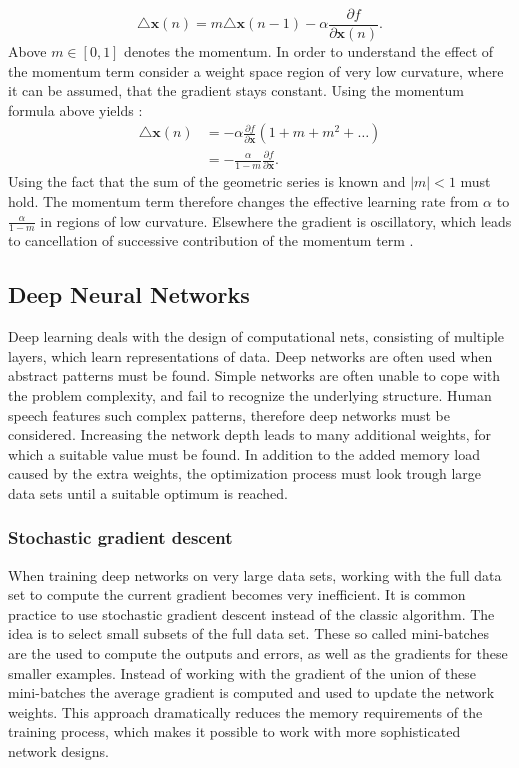 \begin{equation}
\triangle \mathbf{x}(n) = m\triangle \mathbf{x}(n-1) -\alpha \frac{\partial f}{\partial \mathbf{x}(n)}.
\end{equation} 
Above $m \in [0,1]$ denotes the momentum. In order to understand the effect of the momentum term consider a weight space region of very low curvature, where it can be assumed, that the gradient stays constant. Using the momentum formula above yields \cite[page 267]{Bishop1995}:
\begin{align}
\triangle \mathbf{x}(n) &= -\alpha \frac{\partial f}{\partial \mathbf{x}} (1 + m + m^2 + \dots) \\
						&= -\frac{\alpha}{ 1 - m}\frac{\partial f}{\partial \mathbf{x}}.
\end{align}
Using the fact that the sum of the geometric series is known and $|m| < 1$ must hold. The momentum term therefore changes the effective learning rate from $\alpha$ to $\frac{\alpha}{ 1 - m}$ in regions of low curvature. Elsewhere the gradient is oscillatory, which leads to cancellation of successive contribution of the momentum term \cite[page 267]{Bishop1995}.

\subsection{Deep Neural Networks}
Deep learning deals with the design of computational nets, consisting of multiple layers, which learn representations of data. Deep networks are often used when abstract
patterns must be found. Simple networks are often unable to cope with the problem complexity, and fail to recognize the underlying structure. Human speech features such complex patterns, therefore deep networks must be considered. Increasing the network depth leads to many additional weights, for which a suitable value must be found.
In addition to the added memory load caused by the extra weights, the optimization process must look trough large data sets until a suitable optimum is reached.
\subsubsection{Stochastic gradient descent}
When training deep  networks on very large data sets, working with the full data set to compute the current gradient becomes very inefficient. It is common practice to use stochastic gradient descent instead of the classic algorithm. The idea is to select small subsets of the full data set. These so called mini-batches are the used to compute the outputs and errors, as well as the gradients for these smaller examples. Instead of working with the gradient of the union of these mini-batches the average gradient is computed and used to update the network weights. This approach dramatically reduces the memory requirements of the training process, which makes it possible to work with more sophisticated network designs.

